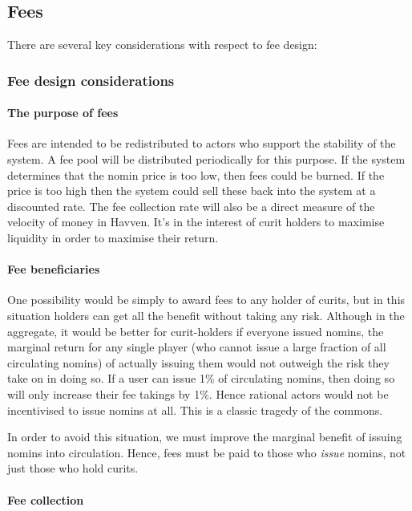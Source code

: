 \pagebreak
\subsection{Fees}

There are several key considerations with respect to fee design:

\subsubsection{Fee design considerations}

\paragraph{The purpose of fees}

Fees are intended to be redistributed to actors who support the stability of the system. A fee pool will be distributed periodically for this purpose.
If the system determines that the nomin price is too low, then fees could be burned. If the price is too high then the system could sell these back
into the system at a discounted rate. The fee collection rate will also be a direct measure of the velocity of money in Havven. It's in the interest
of curit holders to maximise liquidity in order to maximise their return.

\paragraph{Fee beneficiaries}

One possibility would be simply to award fees to any holder of curits,
but in this situation holders can get all the benefit without taking any risk.
Although in the aggregate, it would be better for curit-holders if everyone issued nomins,
the marginal return for any single player (who cannot issue a large fraction of all circulating nomins)
of actually issuing them would not outweigh the risk they take on in doing so. If a user can issue 1\% of circulating
nomins, then doing so will only increase their fee takings by 1\%. Hence rational actors would not be incentivised to issue nomins at all.
This is a classic tragedy of the commons.

\noindent In order to avoid this situation, we must improve the marginal benefit of issuing nomins into circulation.
Hence, fees must be paid to those who \textit{issue} nomins, not just those who hold curits.

\paragraph{Fee collection}

